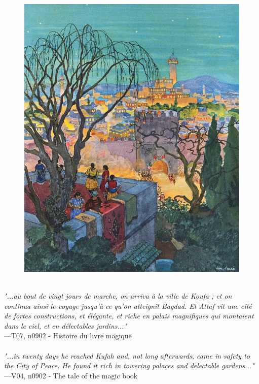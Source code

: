 \documentclass[../Carre_nights.tex]{subfiles}
\begin{document}
\begin{figure}[ht]
\centering
\includegraphics[height=\figsize]{illustrations/volume_7/T07, n0902 - Histoire du livre magique.jpg}
\end{figure}

\textit{\\
"...au bout de vingt jours de marche, on arriva à la ville de Koufa ; et on continua ainsi le voyage jusqu’à ce qu’on atteignît Bagdad. Et Attaf vit une cité de fortes constructions, et élégante, et riche en palais magnifiques qui montaient dans le ciel, et en délectables jardins..."} \\
—T07, n0902 - Histoire du livre magique \\~\\
\textit{"...in twenty days he reached Kufah and, not long afterwards, came in safety to the City of Peace. He found it rich in towering palaces and delectable gardens..."} \\
—V04, n0902 - The tale of the magic book
\end{document}
